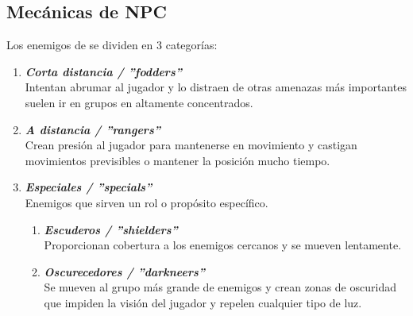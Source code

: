     \subsection{Mecánicas de NPC}
        Los enemigos de \TWD se dividen en 3 categorías:
            \begin{enumerate}
                \item \textbf{\textit{Corta distancia / ''fodders''}} \\
                    Intentan abrumar al jugador y lo distraen de otras amenazas más importantes suelen ir en grupos en altamente concentrados.
                \item  \textbf{\textit{A distancia / ''rangers''}} \\
                    Crean presión al jugador para mantenerse en movimiento y castigan movimientos previsibles o mantener la posición mucho tiempo.
                \item  \textbf{\textit{Especiales / ''specials''}} \\
                    Enemigos que sirven un rol o propósito específico.
                    \begin{enumerate}
                        \item \textbf{\textit{Escuderos / ''shielders''}}\\
                            Proporcionan cobertura a los enemigos cercanos y se mueven lentamente.
                        \item \textbf{\textit{Oscurecedores / ''darkneers''}}\\
                            Se mueven al grupo más grande de enemigos y crean zonas de oscuridad que impiden la visión del jugador y repelen cualquier tipo de luz.
                    \end{enumerate}
            \end{enumerate}

